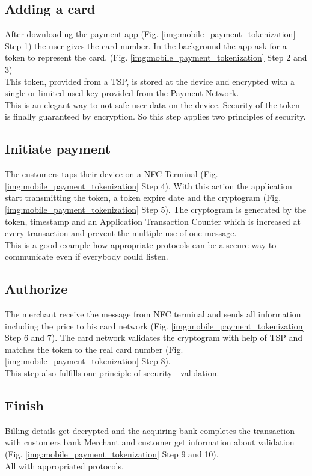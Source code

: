 \subsection{Adding a card}
\label{chp:example:sec:googlePay:ssec:addingACard}

After downloading the payment app (Fig. \ref{img:mobile_payment_tokenization} Step 1) the user gives the card number. In the background the app ask for a token to represent the card. (Fig. \ref{img:mobile_payment_tokenization} Step 2 and 3)\\
This token, provided from a TSP, is stored at the device and encrypted with a single or limited used key provided from the Payment Network. \\
This is an elegant way to not safe user data on the device. Security of the token is finally guaranteed by encryption. So this step applies two principles of security. 

\subsection{Initiate payment}
\label{chp:example:sec:googlePay:ssec:initiate}

The customers taps their device on a NFC Terminal (Fig. \ref{img:mobile_payment_tokenization} Step 4). With this action the application start transmitting the token, a token expire date and the cryptogram (Fig. \ref{img:mobile_payment_tokenization} Step 5). The cryptogram is generated by the token, timestamp and an Application Transaction Counter which is increased at every transaction and prevent the multiple use of one message.\\
This is a good example how appropriate protocols can be a secure way to communicate even if everybody could listen.\\

\subsection{Authorize}
\label{chp:example:sec:googlePay:ssec:authorize}

The merchant receive the message from NFC terminal and sends all information including the price to his card network (Fig. \ref{img:mobile_payment_tokenization} Step 6 and 7). The card network validates the cryptogram with help of TSP and matches the token to the real card number (Fig. \ref{img:mobile_payment_tokenization} Step 8).
\\
This step also fulfills one principle of security - validation.

\subsection{Finish}
\label{chp:example:sec:googlePay:ssec:finish}

Billing details get decrypted and the acquiring bank completes the transaction with customers bank Merchant and customer get information about validation (Fig. \ref{img:mobile_payment_tokenization} Step 9 and 10).\\ All with appropriated protocols. 
  
